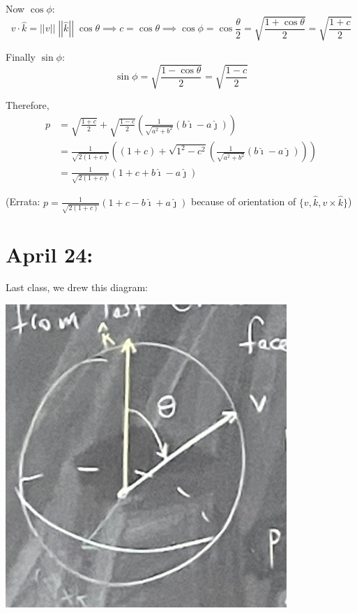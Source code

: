 \documentclass[12pt]{article}
\renewcommand{\hat}[1]{\widehat{#1}}
\newcommand{\norm}[1]{\left\vert \left\vert #1 \right\vert \right\vert}
\newcommand{\ihat}{\hat{\imath}}
\newcommand{\jhat}{\hat{\jmath}}
\newcommand{\khat}{\hat{k}}
\begin{document}
    Now $\cos \phi$: 
    \[v \cdot \khat = \norm v \; \norm \khat \; \cos \theta \implies c = \cos \theta \implies \cos \phi = \cos \frac{\theta}{2} = \sqrt{\frac{1 + \cos \theta}{2}} = \sqrt{\frac{1 + c}{2}}\]

    Finally $\sin \phi$: 
    \[\sin \phi = \sqrt{\frac{1 - \cos \theta}{2}} = \sqrt{\frac{1 - c}{2}}\]

    Therefore, 
    \begin{align*}
        p &= \sqrt{\frac{1 + c}{2}} + \sqrt{\frac{1-c}{2}}\left(\frac{1}{\sqrt{a^2 + b^2}}(b\ihat - a\jhat)\right)\\ 
        &= \frac{1}{\sqrt{2(1 + c)}}\left((1 + c)+ \sqrt{1^2 - c^2}\left(\frac{1}{\sqrt{a^2 + b^2}}(b\ihat - a\jhat)\right) \right)\\ 
        &= \frac{1}{\sqrt{2(1 + c)}}(1 + c + b\ihat - a\jhat)
    \end{align*}

    (Errata: $p = \frac{1}{\sqrt{2(1 + c)}}(1 + c - b\ihat + a\jhat)$ because of orientation of $\{v, \khat, v \times \khat\}$)

\section{April 24:}
    Last class, we drew this diagram: 
    \begin{center}
        \includegraphics[width=0.8\textwidth,angle=-90,origin=c0]{Images/April 24 - rotation ball.png}
    \end{center}
\end{document}

